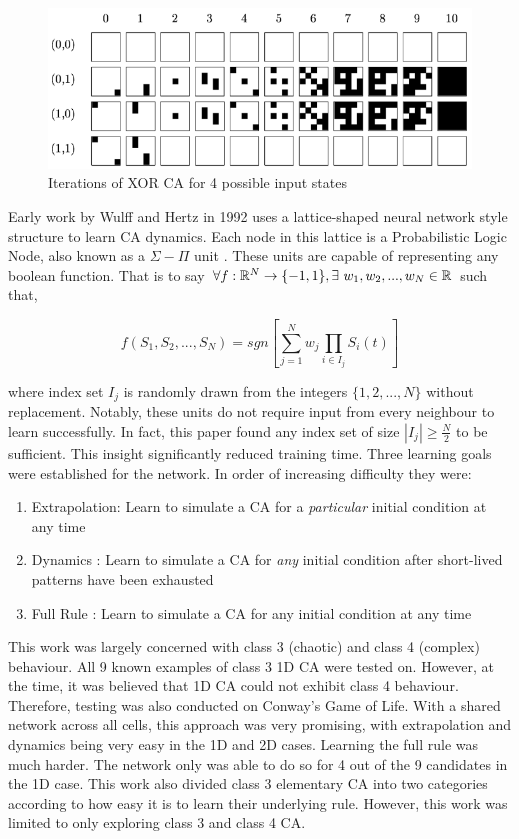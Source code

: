 \begin{figure}[!h]
\centering
\includegraphics[width=.8\textwidth]{images/XOR-ca.png}
\caption{Iterations of XOR CA for 4 possible input states\cite{breukelaar2004evolving}}
\label{fig:xor}
\end{figure}

Early work by Wulff and Hertz in 1992\cite{wulff1992learning} uses a lattice-shaped neural network style structure to learn CA dynamics. Each node in this lattice is a Probabilistic Logic Node, also known as a $\Sigma-\Pi$ unit \cite{gurney1992training}. These units are capable of representing any boolean function. That is to say $ \forall f: \mathbb{R}^N \to \{-1, 1\}, \exists~w_1, w_2, ... , w_N \in \mathbb{R} $ such that,

\begin{equation} \label{eq:sigma_pi}
f(S_1, S_2, ..., S_N) = sgn\left[ \sum_{j=1}^{N} w_j \prod_{i \in I_j} S_i(t) \right]
\end{equation}

where index set $I_j$ is randomly drawn from the integers $\{1, 2, ..., N\}$ without replacement. Notably, these units do not require input from every neighbour to learn successfully. In fact, this paper found any index set of size $|I_j| \geq \frac{N}{2}$ to be sufficient. This insight significantly reduced training time. Three learning goals were established for the network. In order of increasing difficulty they were:

\begin{enumerate}
  \item Extrapolation: Learn to simulate a CA for a \textit{particular} initial condition at any time
  \item Dynamics : Learn to simulate a CA for \textit{any} initial condition after short-lived patterns have been exhausted
  \item Full Rule : Learn to simulate a CA for any initial condition at any time
\end{enumerate}

This work was largely concerned with class 3 (chaotic) and class 4 (complex) behaviour.  All 9 known examples of class 3 1D CA were tested on. However, at the time, it was believed that 1D CA could not exhibit class 4 behaviour. Therefore, testing was also conducted on Conway's Game of Life. With a shared network across all cells, this approach was very promising, with extrapolation and dynamics being very easy in the 1D and 2D cases. Learning the full rule was much harder. The network only was able to do so for 4 out of the 9 candidates in the 1D case. This work also divided class 3 elementary CA into two categories according to how easy it is to learn their underlying rule. However, this work was limited to only exploring class 3 and class 4 CA.\\

